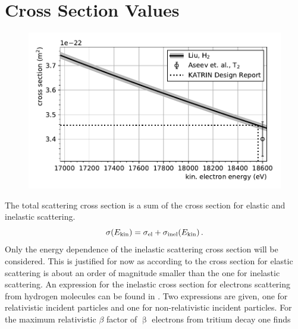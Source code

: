 \section{Cross Section Values}
\begin{figure}[t]
    \centering
    \includegraphics[width=\textwidth]{chapter/energyDependentCrossSec/fig/crossSecNoZoom.pdf}
    \label{fig:scatCrossSec}
\end{figure}
The total scattering cross section is a sum of the cross section for elastic and inelastic scattering.
\begin{equation}
    \sigma(E_\mathrm{kin}) = \sigma_\mathrm{el} + \sigma_\mathrm{inel}(E_\mathrm{kin})
    \text{\,.}
\end{equation}
Only the energy dependence of the inelastic scattering cross section will be considered. This is justified for now as according to \cite{Angrik:2005ep} the cross section for elastic scattering is about an order of magnitude smaller than the one for inelastic scattering. An expression for the inelastic cross section for electrons scattering from hydrogen molecules can be found in \cite{Liu1973}. Two expressions are given, one for relativistic incident particles and one for non-relativistic incident particles. For the maximum relativistic $\beta$ factor of $\upbeta$ electrons from tritium decay one finds
